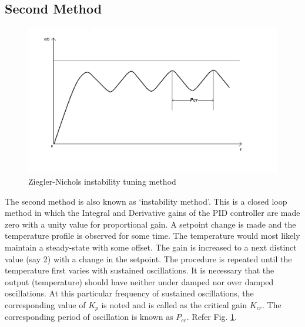 \subsection{Second Method}
\begin{figure}
\centering
\includegraphics[width=\linewidth]{pid_manual/PIDUGtune}
\caption{Ziegler-Nichols instability tuning method}
\label{instability}
\end{figure}
The second method is also known as \textquoteleft instability method\textquoteright \cite{kmmdc09}. This is a closed loop method in which the Integral and Derivative gains of the PID controller are made zero with a unity value for proportional gain. A setpoint change is made and the temperature profile is observed for some time. The temperature would most likely maintain a steady-state with some offset. The gain is increased to a next distinct value (say 2) with a change in the setpoint. The procedure is repeated until the temperature first varies with sustained oscillations. It is necessary that the output (temperature) should have neither under damped nor over damped oscillations. At this particular frequency of sustained oscillations, the corresponding value of $K_p$ is noted and is called as the critical gain $K_{cr}$. The corresponding period of oscillation is known as  $P_{cr}$. Refer Fig. \ref{instability}.

